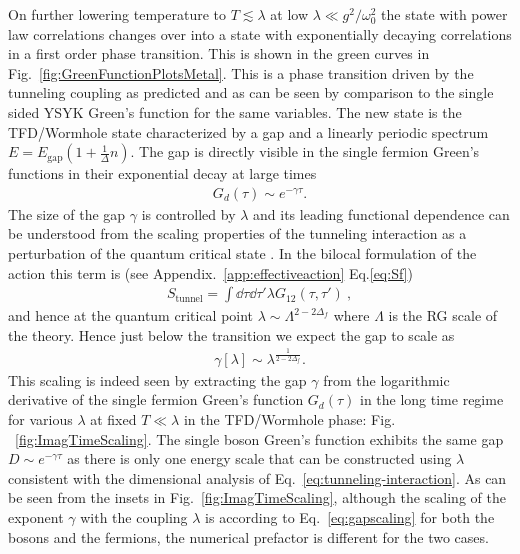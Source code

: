 On further lowering temperature to $T\lesssim \lambda$ at low $\lambda \ll g^{2}/\omega_0^2$ the state with power law correlations changes over into a state with exponentially decaying correlations in a first order phase transition. This is shown in the green curves in Fig.~\ref{fig:GreenFunctionPlotsMetal}. This is a phase transition driven by the tunneling coupling as predicted and as can be seen by  comparison to the single sided YSYK Green's function for the same variables. The new state is the TFD/Wormhole state characterized by a gap and a linearly periodic spectrum $E = E_{\text{gap}}(1+\frac{1}{\Delta} n)$. The gap is directly visible in the single fermion Green's functions in their exponential decay at large times  
\begin{align}
    G_d(\tau) \sim e^{-\gamma \tau}. 
\end{align}
The size of the gap $\gamma$ is controlled by $\lambda$ and its leading functional dependence can be understood from the scaling properties of the tunneling interaction as a perturbation of the quantum critical state \cite{maldacena2018eternal}. In the bilocal formulation of the action this term is (see Appendix.~\ref{app:effectiveaction} Eq.\eqref{eq:Sf}) 
\begin{align}
\label{eq:tunneling-interaction}
    S_{\text{tunnel}} =\int\dd\tau\dd\tau' \lambda G_{12}(\tau,\tau')~,
\end{align}
and hence at the quantum critical point $\lambda \sim \Lambda^{2-2\Delta_f}$ where $\Lambda$ is the RG scale of the theory.
Hence just below the transition we expect the gap to scale as 
\begin{align}
    \gamma[\lambda] \sim \lambda^{\frac{1}{2-2\Delta_f}}. 
    \label{eq:gapscaling}
\end{align}
This scaling is indeed seen by extracting the gap $\gamma$ from the logarithmic derivative of the single fermion Green's function $G_d(\tau)$ in the long time regime  for various $\lambda$ at fixed $T\ll \lambda$ in the TFD/Wormhole phase: Fig. ~\ref{fig:ImagTimeScaling}. The single boson Green's function exhibits the same gap $D \sim e^{-\gamma\tau}$ as there is only one energy scale that can be constructed using $\lambda$ consistent with the dimensional analysis of Eq.~\eqref{eq:tunneling-interaction}. As can be seen from the insets in Fig.~\ref{fig:ImagTimeScaling}, although the scaling of the exponent $\gamma$ with the coupling $\lambda$ is according to Eq.~\eqref{eq:gapscaling} for both the bosons and the fermions, the numerical prefactor is different for the two cases. %
%



